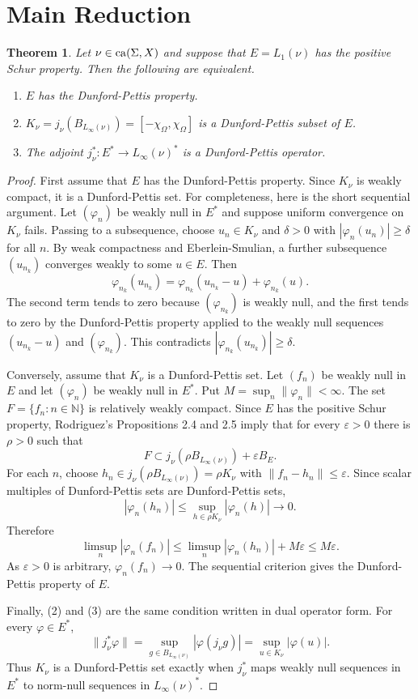 \documentclass[11pt]{amsart}
\newtheorem{theorem}{Theorem}
\newcommand{\Lone}{L_1(\nu)}
\newcommand{\Linfty}{L_\infty(\nu)}
\newcommand{\eps}{\varepsilon}
\newcommand{\N}{\mathbb N}
\begin{document}
\section*{Main Reduction}

\begin{theorem}
Let $\nu\in{\rm ca}(\Sigma,X)$ and suppose that $E=\Lone$ has the positive
Schur property.  Then the following are equivalent.
\begin{enumerate}
\item $E$ has the Dunford-Pettis property.
\item $K_\nu=j_\nu(B_{\Linfty})=[-\chi_\Omega,\chi_\Omega]$ is a
      Dunford-Pettis subset of $E$.
\item The adjoint $j_\nu^*:E^*\to\Linfty^*$ is a Dunford-Pettis operator.
\end{enumerate}
\end{theorem}

\begin{proof}
First assume that $E$ has the Dunford-Pettis property.  Since $K_\nu$ is
weakly compact, it is a Dunford-Pettis set.  For completeness, here is the
short sequential argument.  Let $(\varphi_n)$ be weakly null in $E^*$ and
suppose uniform convergence on $K_\nu$ fails.  Passing to a subsequence, choose
$u_n\in K_\nu$ and $\delta>0$ with $|\varphi_n(u_n)|\geq\delta$ for all $n$.
By weak compactness and Eberlein-Smulian, a further subsequence $(u_{n_k})$
converges weakly to some $u\in E$.  Then
\[
        \varphi_{n_k}(u_{n_k})
        =
        \varphi_{n_k}(u_{n_k}-u)+\varphi_{n_k}(u).
\]
The second term tends to zero because $(\varphi_{n_k})$ is weakly null, and
the first tends to zero by the Dunford-Pettis property applied to the weakly
null sequences $(u_{n_k}-u)$ and $(\varphi_{n_k})$.  This contradicts
$|\varphi_{n_k}(u_{n_k})|\geq\delta$.

Conversely, assume that $K_\nu$ is a Dunford-Pettis set.  Let $(f_n)$ be
weakly null in $E$ and let $(\varphi_n)$ be weakly null in $E^*$.  Put
$M=\sup_n\|\varphi_n\|<\infty$.  The set
$F=\{f_n:n\in\N\}$ is relatively weakly compact.  Since $E$ has the positive
Schur property, Rodriguez's Propositions 2.4 and 2.5 imply that for every
$\eps>0$ there is $\rho>0$ such that
\[
        F\subset j_\nu(\rho B_{\Linfty})+\eps B_E.
\]
For each $n$, choose $h_n\in j_\nu(\rho B_{\Linfty})=\rho K_\nu$ with
$\|f_n-h_n\|\leq\eps$.  Since scalar multiples of Dunford-Pettis sets are
Dunford-Pettis sets,
\[
        |\varphi_n(h_n)|\leq
        \sup_{h\in \rho K_\nu}|\varphi_n(h)|
        \longrightarrow 0.
\]
Therefore
\[
        \limsup_n |\varphi_n(f_n)|
        \leq
        \limsup_n |\varphi_n(h_n)| + M\eps
        \leq M\eps.
\]
As $\eps>0$ is arbitrary, $\varphi_n(f_n)\to0$.  The sequential criterion gives
the Dunford-Pettis property of $E$.

Finally, (2) and (3) are the same condition written in dual operator form.  For
every $\varphi\in E^*$,
\[
        \|j_\nu^*\varphi\|
        =
        \sup_{g\in B_{\Linfty}} |\varphi(j_\nu g)|
        =
        \sup_{u\in K_\nu} |\varphi(u)|.
\]
Thus $K_\nu$ is a Dunford-Pettis set exactly when $j_\nu^*$ maps weakly null
sequences in $E^*$ to norm-null sequences in $\Linfty^*$.
\end{proof}
\end{document}
